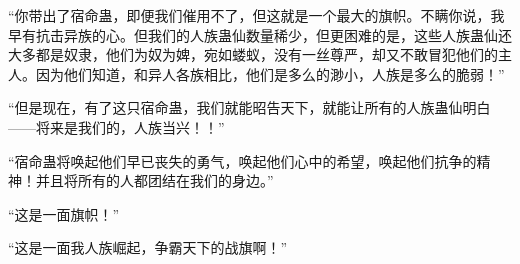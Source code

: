 \begin{this_body}
“你带出了宿命蛊，即便我们催用不了，但这就是一个最大的旗帜。不瞒你说，我早有抗击异族的心。但我们的人族蛊仙数量稀少，但更困难的是，这些人族蛊仙还大多都是奴隶，他们为奴为婢，宛如蝼蚁，没有一丝尊严，却又不敢冒犯他们的主人。因为他们知道，和异人各族相比，他们是多么的渺小，人族是多么的脆弱！”

“但是现在，有了这只宿命蛊，我们就能昭告天下，就能让所有的人族蛊仙明白——将来是我们的，人族当兴！！”

“宿命蛊将唤起他们早已丧失的勇气，唤起他们心中的希望，唤起他们抗争的精神！并且将所有的人都团结在我们的身边。”

“这是一面旗帜！”

“这是一面我人族崛起，争霸天下的战旗啊！”

\end{this_body}

